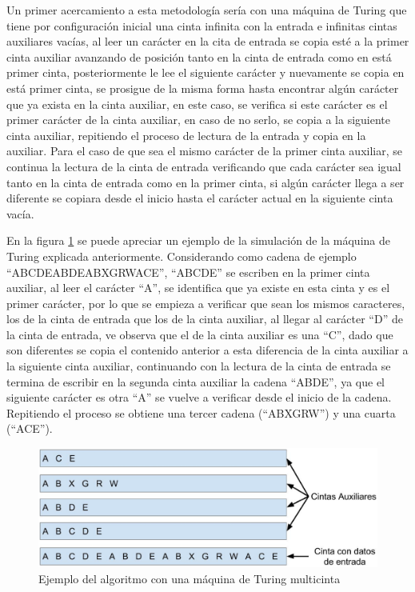 Un primer acercamiento a esta metodolog\'ia ser\'ia con una m\'aquina de 
 Turing que tiene por configuraci\'on inicial una cinta infinita
 con la entrada e infinitas cintas auxiliares vac\'ias, al leer
 un car\'acter en la cita de entrada se copia est\'e a la primer 
 cinta auxiliar avanzando de posici\'on tanto en la cinta de entrada como 
 en est\'a primer cinta, posteriormente le lee el siguiente car\'acter y 
 nuevamente se copia en est\'a primer cinta, se prosigue de la misma forma 
 hasta encontrar alg\'un car\'acter que ya exista en la cinta auxiliar, en 
 este caso, se verifica si este car\'acter es el primer car\'acter de la cinta
 auxiliar, en caso de no serlo, se copia a la siguiente cinta auxiliar, 
 repitiendo el proceso de lectura de la entrada y copia en la auxiliar. 
 Para el caso de que sea el mismo car\'acter de la primer cinta auxiliar, 
 se continua la lectura de la cinta de entrada verificando que cada car\'acter 
 sea igual tanto en la cinta de entrada como en la primer cinta, si alg\'un 
 car\'acter llega a ser diferente se copiara desde el inicio hasta el 
 car\'acter actual en la siguiente cinta vac\'ia.

  
En la figura \ref{fig:alg01} se puede apreciar un ejemplo de la simulaci\'on de 
 la m\'aquina de Turing explicada anteriormente. Considerando como cadena de 
 ejemplo ``ABCDEABDEABXGRWACE'', ``ABCDE'' se escriben en la primer cinta 
 auxiliar, al leer el car\'acter ``A'', se identifica que ya existe en esta 
 cinta y es el primer car\'acter, por lo que se empieza a verificar que sean
 los mismos caracteres, los de la cinta de entrada que los de la cinta 
 auxiliar, al llegar al car\'acter ``D'' de la cinta de entrada, ve observa 
 que el de la cinta auxiliar es una ``C'', dado que son diferentes se copia 
 el contenido anterior a esta diferencia de la cinta auxiliar a la siguiente 
 cinta auxiliar, continuando con la lectura de la cinta de entrada se termina 
 de escribir en la segunda cinta auxiliar la cadena ``ABDE'', ya que el 
 siguiente car\'acter es otra ``A'' se vuelve a verificar desde el inicio de 
 la cadena. Repitiendo el proceso se obtiene una tercer cadena (``ABXGRW'') 
 y una cuarta (``ACE'').
  
\begin{figure}[h]
\centering
\includegraphics[width=1.0\columnwidth]{chap4/Imagenes/algoritmo1.eps}
\caption{Ejemplo del algoritmo con una m\'aquina de Turing multicinta}
\label{fig:alg01}
\end{figure}
 